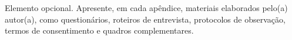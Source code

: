 
\label{apd:instrumento}

Elemento opcional. Apresente, em cada apêndice, materiais elaborados pelo(a) autor(a), como questionários, roteiros de entrevista, protocolos de observação, termos de consentimento e quadros complementares.

% 
